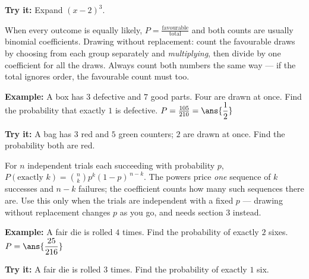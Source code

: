 \documentclass[12pt]{article}
\begin{document}
\begin{tryitbox}
\textbf{Try it:} Expand $(x - 2)^3$.\\[2pt]
\end{tryitbox}


\begin{formulabox}
When every outcome is equally likely, $P = \frac{\text{favourable}}{\text{total}}$
and both counts are usually binomial coefficients. Drawing without replacement:
count the favourable draws by choosing from each group separately and
\emph{multiplying}, then divide by one coefficient for all the draws. Always
count both numbers the same way --- if the total ignores order, the favourable
count must too.
\end{formulabox}

\begin{examplebox}
\textbf{Example:} A box has $3$ defective and $7$ good parts. Four are drawn at
once. Find the probability that exactly $1$ is defective.
$P = \frac{105}{210} = \ans{\dfrac{1}{2}}$
\end{examplebox}

\begin{tryitbox}
\textbf{Try it:} A bag has $3$ red and $5$ green counters; $2$ are drawn at
once. Find the probability both are red.\\[2pt]
\end{tryitbox}


\begin{formulabox}
For $n$ independent trials each succeeding with probability $p$,
$P(\text{exactly } k) = \binom{n}{k}p^k(1-p)^{\,n-k}$. The powers price
\emph{one} sequence of $k$ successes and $n-k$ failures; the coefficient counts
how many such sequences there are. Use this only when the trials are
independent with a fixed $p$ --- drawing without replacement changes $p$ as you
go, and needs section $3$ instead.
\end{formulabox}

\begin{examplebox}
\textbf{Example:} A fair die is rolled $4$ times. Find the probability of
exactly $2$ sixes.
$P = \ans{\dfrac{25}{216}}$
\end{examplebox}

\begin{tryitbox}
\textbf{Try it:} A fair die is rolled $3$ times. Find the probability of exactly
$1$ six.\\[2pt]
\end{tryitbox}
\end{document}
